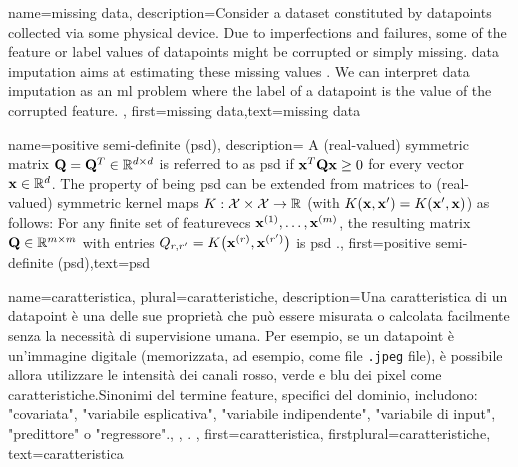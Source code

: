 {name={missing data},
	description={Consider a \gls{dataset} constituted by \gls{datapoint}s collected via 
		some physical \gls{device}. Due to imperfections and failures, some of the \gls{feature} 
		or \gls{label} values of \gls{datapoint}s might be corrupted or simply missing. 
		\Gls{data} imputation aims at estimating these missing values \cite{Abayomi2008DiagnosticsFM}. 
		We can interpret \gls{data} imputation as an \gls{ml} problem where the \gls{label} of a \gls{datapoint} is 
		the value of the corrupted \gls{feature}. },
	first={missing data},text={missing data}  
}


{name={positive semi-definite (psd)},
	description=
	{A (real-valued) symmetric matrix $\mathbf{Q} = \mathbf{Q}^{T} \in \mathbb{R}^{d \times d}$ 
	 is referred to as psd if ${\bf x}^{T} \mathbf{Q} {\bf x} \geq 0$ for every vector ${\bf x} \in \mathbb{R}^{d}$. 
	 The property of being psd can be extended from matrices to (real-valued) 
	 symmetric \gls{kernel} maps $K: \mathcal{X} \times \mathcal{X} \rightarrow \mathbb{R}$ 
	 (with $K({\bf x},{\bf x}') = K({\bf x}',{\bf x})$)
	 as follows: For any finite set of \gls{featurevec}s ${\bf x}^{(1)},\dots,{\bf x}^{(m)}$, 
	 the resulting matrix $\mathbf{Q} \in \mathbb{R}^{m \times m}$ with 
	entries $Q_{r,r'} = K\big({\bf x}^{(r)},{\bf x}^{(r')}\big)$ 
	is psd \cite{LearningKernelsBook}.},
	first={positive semi-definite (psd)},text={psd}  
}

{name={caratteristica}, plural={caratteristiche},
	description={Una  caratteristica di un \gls{datapoint} è una delle sue proprietà 
		che può essere misurata o calcolata facilmente senza la necessità di supervisione umana. Per esempio, se un \gls{datapoint} 
		è un'immagine digitale (memorizzata, ad esempio, come file \texttt{.jpeg} file), è possibile allora utilizzare le intensità dei canali rosso, 
		verde e blu dei pixel come caratteristiche.Sinonimi del termine feature, specifici del dominio, includono: "covariata", "variabile esplicativa", 
		"variabile indipendente", "variabile di input", "predittore" o "regressore".\cite{Gujarati2021}, \cite{Dodge2003}, \cite{Everitt2022}. 
		}, first={caratteristica}, firstplural={caratteristiche}, text={caratteristica}  
}

